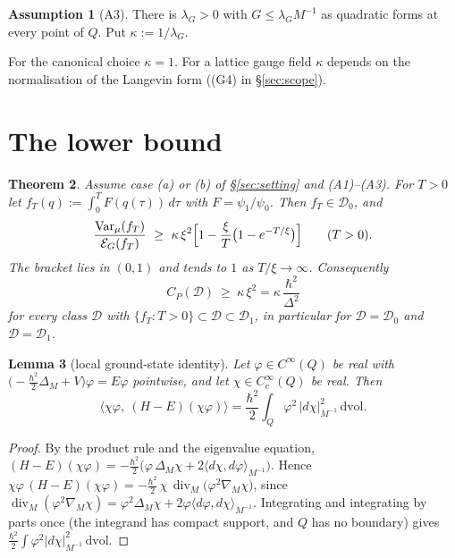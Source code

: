 \documentclass[11pt,a4paper]{article}
\newtheorem{theorem}{Theorem}[section]
\newtheorem{lemma}[theorem]{Lemma}
\theoremstyle{definition}
\newtheorem{assumption}[theorem]{Assumption}
\theoremstyle{remark}
\newcommand{\Var}{\operatorname{Var}}
\newcommand{\cE}{\mathcal{E}}
\newcommand{\cD}{\mathcal{D}}
\newcommand{\dvol}{\,\mathrm{dvol}}
\begin{document}
\begin{assumption}[A3]\label{ass:A3}
There is $\lambda_G>0$ with $G\le\lambda_G M^{-1}$ as quadratic forms at every point of $Q$. Put $\kappa:=1/\lambda_G$.
\end{assumption}

For the canonical choice $\kappa=1$.
For a lattice gauge field $\kappa$ depends on the normalisation of the Langevin form ((G4) in \S\ref{sec:scope}).

\section{The lower bound}\label{sec:main}

\begin{theorem}\label{thm:main}
Assume case (a) or (b) of \S\ref{sec:setting} and (A1)--(A3).
For $T>0$ let $f_T(q):=\int_0^T F(q(\tau))\,d\tau$ with $F=\psi_1/\psi_0$.
Then $f_T\in\cD_0$, and
\begin{equation}\label{eq:window}
  \frac{\Var_\mu(f_T)}{\cE_G(f_T)}\ \ge\ \kappa\,\xi^2\Bigl[1-\frac{\xi}{T}\bigl(1-e^{-T/\xi}\bigr)\Bigr]\qquad(T>0).
\end{equation}
The bracket lies in $(0,1)$ and tends to $1$ as $T/\xi\to\infty$. Consequently
\[
  C_P(\cD)\ \ge\ \kappa\,\xi^2=\kappa\,\frac{\hbar^2}{\Delta^2}
\]
for every class $\cD$ with $\{f_T:T>0\}\subset\cD\subset\cD_1$, in particular for $\cD=\cD_0$ and $\cD=\cD_1$.
\end{theorem}


\begin{lemma}[local ground-state identity]\label{lem:gst}
Let $\varphi\in C^\infty(Q)$ be real with $\bigl(-\tfrac{\hbar^2}{2}\Delta_M+V\bigr)\varphi=E\varphi$ pointwise, and let $\chi\in C_c^\infty(Q)$ be real. Then
\[
  \bigl\langle\chi\varphi,\ (H-E)(\chi\varphi)\bigr\rangle=\frac{\hbar^2}{2}\int_Q\varphi^2\,|d\chi|^2_{M^{-1}}\dvol .
\]
\end{lemma}

\begin{proof}
By the product rule and the eigenvalue equation,
$(H-E)(\chi\varphi)=-\tfrac{\hbar^2}{2}\bigl(\varphi\,\Delta_M\chi+2\langle d\chi,d\varphi\rangle_{M^{-1}}\bigr)$.
Hence $\chi\varphi\,(H-E)(\chi\varphi)=-\tfrac{\hbar^2}{2}\,\chi\,\operatorname{div}_M\bigl(\varphi^2\nabla_M\chi\bigr)$, since $\operatorname{div}_M(\varphi^2\nabla_M\chi)=\varphi^2\Delta_M\chi+2\varphi\langle d\varphi,d\chi\rangle_{M^{-1}}$.
Integrating and integrating by parts once (the integrand has compact support, and $Q$ has no boundary) gives $\tfrac{\hbar^2}{2}\int\varphi^2|d\chi|^2_{M^{-1}}\dvol$.
\end{proof}
\end{document}
